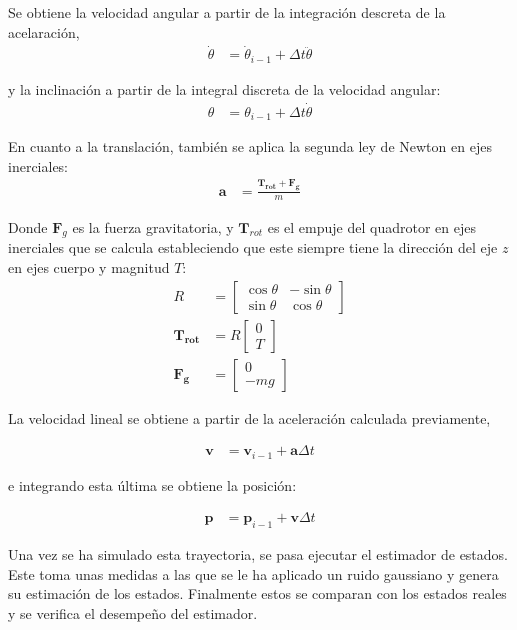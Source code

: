 Se obtiene la velocidad angular a partir de la integración descreta de la acelaración,
\begin{align}
        \dot{\theta} &= \dot{\theta}_{i-1} + \Delta t \ddot{\theta} 
\end{align}

y la inclinación a partir de la integral discreta de la velocidad angular:
\begin{align}
        \theta &= \theta_{i-1} + \Delta t \dot{\theta}
\end{align}

En cuanto a la translación, también se aplica la segunda ley de Newton en ejes inerciales:
\begin{align}
         \bm{a}& = \frac{\bm{T_{rot}}+\bm{F_g}}{m}
\end{align}

Donde $\bm{F}_g$ es la fuerza gravitatoria, y $\bm{T}_{rot}$ es el empuje del quadrotor en ejes inerciales que se calcula estableciendo que este siempre tiene la dirección del eje $z$ en ejes cuerpo y magnitud $T$:
\begin{align}
        R &= 
\begin{bmatrix}
\cos{\theta}& -\sin{\theta}\\
\sin{\theta} & \cos{\theta}
\end{bmatrix}\\
         \bm{T_{rot}}&= R  \begin{bmatrix}0\\ T \end{bmatrix}\\
         \bm{F_g}&= \begin{bmatrix}0\\ -m g \end{bmatrix}
\end{align}

La velocidad lineal se obtiene a partir de la aceleración calculada previamente, 

\begin{align}
         \bm{v}& = \bm{v}_{i-1} + \bm{a}\Delta t  
\end{align}

e integrando esta última se obtiene la posición:
 
\begin{align}
        \bm{p} &= \bm{p}_{i-1} + \bm{v}\Delta t  
\end{align}




Una vez se ha simulado esta trayectoria, se pasa ejecutar el estimador de estados. Este toma unas medidas a las que se le ha aplicado un ruido gaussiano y genera su estimación de los estados. Finalmente estos se comparan con los estados reales y se verifica el desempeño del estimador. 

